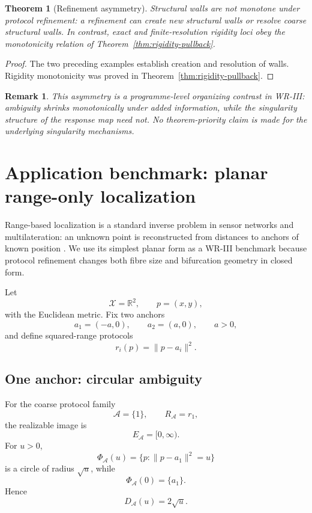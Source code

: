 \documentclass[11pt]{article}
\newtheorem{theorem}[definition]{Theorem}
\newtheorem{remark}[definition]{Remark}
\newcommand{\X}{\mathcal X}
\newcommand{\Acal}{\mathcal A}
\begin{document}
\begin{theorem}[Refinement asymmetry]
Structural walls are not monotone under protocol refinement: a refinement can
create new structural walls or resolve coarse structural walls. In contrast,
exact and finite-resolution rigidity loci obey the monotonicity relation of
Theorem~\ref{thm:rigidity-pullback}.
\end{theorem}

\begin{proof}
The two preceding examples establish creation and resolution of walls.
Rigidity monotonicity was proved in Theorem~\ref{thm:rigidity-pullback}.
\end{proof}

\begin{remark}
This asymmetry is a programme-level organizing contrast in WR-III: ambiguity
shrinks monotonically under added information, while the singularity structure
of the response map need not. No theorem-priority claim is made for the
underlying singularity mechanisms.
\end{remark}

\section{Application benchmark: planar range-only localization}
\label{sec:range-localization}

Range-based localization is a standard inverse problem in sensor networks and
multilateration: an unknown point is reconstructed from distances to anchors of
known position \cite{AspnesEtAl2006,AndersonEtAl2010}. We use its simplest
planar form as a WR-III benchmark because protocol refinement changes both
fibre size and bifurcation geometry in closed form.

Let
\[
\X=\mathbb R^2,
\qquad
p=(x,y),
\]
with the Euclidean metric. Fix two anchors
\[
a_1=(-a,0),
\qquad
a_2=(a,0),
\qquad
a>0,
\]
and define squared-range protocols
\[
r_i(p)=\|p-a_i\|^2.
\]

\subsection{One anchor: circular ambiguity}

For the coarse protocol family
\[
\Acal=\{1\},
\qquad
R_{\Acal}=r_1,
\]
the realizable image is
\[
E_{\Acal}=[0,\infty).
\]
For \(u>0\),
\[
\Phi_{\Acal}(u)
=
\{p:\|p-a_1\|^2=u\}
\]
is a circle of radius \(\sqrt u\), while
\[
\Phi_{\Acal}(0)=\{a_1\}.
\]
Hence
\[
D_{\Acal}(u)=2\sqrt u.
\]
\end{document}
